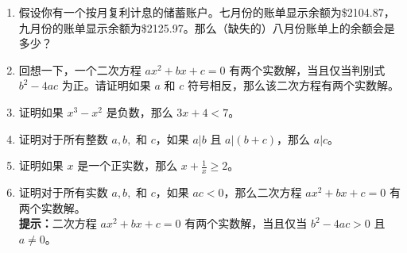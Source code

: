 \begin{enumerate}
    \item 
    假设你有一个按月复利计息的储蓄账户。七月份的账单显示余额为\$2104.87，九月份的账单显示余额为\$2125.97。那么（缺失的）八月份账单上的余额会是多少？
    
    \wbvfill
    
    \item \label{quad} 
    
    回想一下，一个二次方程 $ax^2+bx+c=0$ 有两个实数解，当且仅当判别式 $b^2-4ac$ 为正。请证明如果 $a$ 和 $c$ 符号相反，那么该二次方程有两个实数解。
    
    \wbvfill
    
    \rule{0pt}{0pt}
    
    \wbvfill
    
    \workbookpagebreak
    
    \item 
    证明如果 $x^3-x^2$ 是负数，那么 $3x+4 < 7$。
    
    \wbvfill
    
    \item 
    
    证明对于所有整数 $a,b,$ 和 $c$，如果 $a|b$ 且 $a|(b+c)$，那么 $a|c$。
    \wbvfill
    
    \workbookpagebreak
    
    \item 
    证明如果 $x$ 是一个正实数，那么 $x+\frac{1}{x} \geq 2$。
    
    \wbvfill
    
    \item 
    
    证明对于所有实数 $a,b,$ 和 $c$，如果 $ac<0$，那么二次方程 $ax^{2}+bx+c=0$ 有两个实数解。\\
    \textbf{提示：}二次方程 $ax^{2}+bx+c=0$ 有两个实数解，当且仅当 $b^{2}-4ac>0$ 且 $a\neq0$。
    

\end{enumerate}
